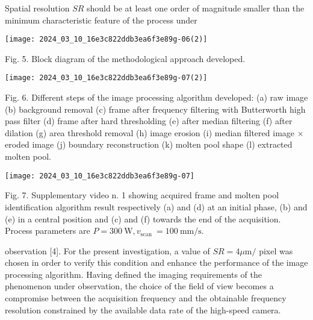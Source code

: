 \documentclass[10pt]{article}
\begin{document}
Spatial resolution $S R$ should be at least one order of magnitude smaller than the minimum characteristic feature of the process under

\begin{center}
\texttt{[image: 2024\_03\_10\_16e3c822ddb3ea6f3e89g-06(2)]}
\end{center}

Fig. 5. Block diagram of the methodological approach developed.

\begin{center}
\texttt{[image: 2024\_03\_10\_16e3c822ddb3ea6f3e89g-07(2)]}
\end{center}

Fig. 6. Different steps of the image processing algorithm developed: (a) raw image (b) background removal (c) frame after frequency filtering with Butterworth high pass filter (d) frame after hard thresholding (e) after median filtering (f) after dilation (g) area threshold removal (h) image erosion (i) median filtered image $\times$ eroded image (j) boundary reconstruction (k) molten pool shape (l) extracted molten pool.

\begin{center}
\texttt{[image: 2024\_03\_10\_16e3c822ddb3ea6f3e89g-07]}
\end{center}

Fig. 7. Supplementary video n. 1 showing acquired frame and molten pool identification algorithm result respectively (a) and (d) at an initial phase, (b) and (e) in a central position and (c) and (f) towards the end of the acquisition. Process parameters are $P=300 \mathrm{~W}, v_{\text {scan }}=100 \mathrm{~mm} / \mathrm{s}$.

observation [4]. For the present investigation, a value of $S R=4 \mu \mathrm{m} /$ pixel was chosen in order to verify this condition and enhance the performance of the image processing algorithm. Having defined the imaging requirements of the phenomenon under observation, the choice of the field of view becomes a compromise between the acquisition frequency and the obtainable frequency resolution constrained by the available data rate of the high-speed camera.
\end{document}
